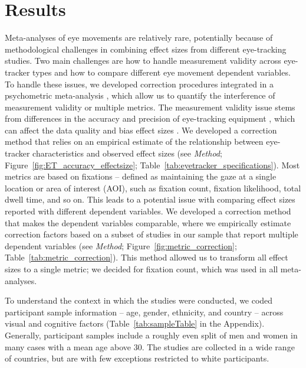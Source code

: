 
\section{Results}

Meta-analyses of eye movements are relatively rare, potentially because of methodological challenges in combining effect sizes from different eye-tracking studies. Two main challenges are how to handle measurement validity across eye-tracker types and how to compare different eye movement dependent variables. To handle these issues, we developed correction procedures integrated in a psychometric meta-analysis \citep{hunter2004a}, which allow us to quantify the interference of measurement validity or multiple metrics. The measurement validity issue stems from differences in the accuracy and precision of eye-tracking equipment \citep{holmqvist2015a}, which can affect the data quality and bias effect sizes \citep{orquin2016a}. We developed a correction method that relies on an empirical estimate of the relationship between eye-tracker characteristics and observed effect sizes (see \textit{Method}; Figure~\ref{fig:ET_accuracy_effectsize}; Table~\ref{tab:eyetracker_specifications}). Most metrics are based on fixations -- defined as maintaining the gaze at a single location or area of interest (AOI), such as fixation count, fixation likelihood, total dwell time, and so on. This leads to a potential issue with comparing effect sizes reported with different dependent variables. We developed a correction method that makes the dependent variables comparable, where we empirically estimate correction factors based on a subset of studies in our sample that report multiple dependent variables (see \textit{Method}; Figure~\ref{fig:metric_correction}; Table~\ref{tab:metric_correction}). This method allowed us to transform all effect sizes to a single metric; we decided for fixation count, which was used in all meta-analyses. 

To understand the context in which the studies were conducted, we coded participant sample information -- age, gender, ethnicity, and country -- across visual and cognitive factors (Table~\ref{tab:sampleTable} in the Appendix). Generally, participant samples include a roughly even split of men and women in many cases with a mean age above 30. The studies are collected in a wide range of countries, but are with few exceptions restricted to white participants. 

